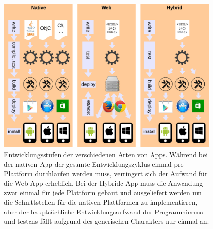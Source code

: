 








\begin{figure}
\centering
\includegraphics[width=1\linewidth]{./images/hybrid-apps-schaubild}
\caption[Schaubild Hybrid Apps]{Entwicklungsstufen der verschiedenen Arten von Apps. Während bei der nativen App der gesamte Entwicklungszyklus einmal pro Plattform durchlaufen werden muss, verringert sich der Aufwand für die Web-App erheblich. Bei der Hybride-App muss die Anwendung zwar einmal für jede Plattform gebaut und ausgeliefert werden um die Schnittstellen für die nativen Plattformen zu implementieren, aber der hauptsächliche Entwicklungsaufwand des Programmierens und testens fällt aufgrund des generischen Charakters nur einmal an.}
\label{fig:hybrid-apps-schaubild}
\end{figure}



